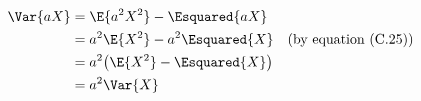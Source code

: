 \liftdisplaystyle
\begin{align*}
    \Var{aX} &= \E{a^2X^2}-\Esquared{aX} \\
    &= a^2\E{X^2}-a^2\Esquared{X} && \text{(by equation (C.25))} \\
    &= a^2\!\left(\E{X^2}-\Esquared{X}\right) \\
    &= a^2\Var{X}
\end{align*}
